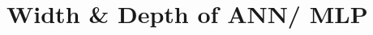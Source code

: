 \section{Width \& Depth of ANN/ MLP \cite{arxiv-2010.15327}}




























































































